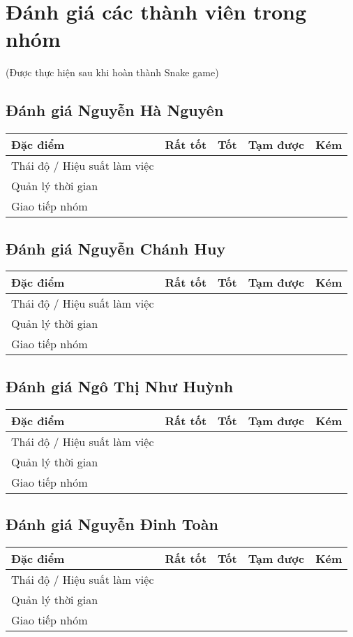 \documentclass[a4paper,12pt]{article}
\begin{document}
\newpage
\section{Đánh giá các thành viên trong nhóm} (Được thực hiện sau khi hoàn thành Snake game)

\subsection{Đánh giá Nguyễn Hà Nguyên}
\begin{tabularx}{\textwidth}{|X|X|X|X|X|}
\hline
\textbf{Đặc điểm} & \textbf{Rất tốt} & \textbf{Tốt} & \textbf{Tạm được} & \textbf{Kém} \\
\hline
Thái độ / Hiệu suất làm việc &  & & & \\
\hline
Quản lý thời gian & &  & & \\
\hline
Giao tiếp nhóm &  & & & \\
\hline
\end{tabularx}

\subsection{Đánh giá Nguyễn Chánh Huy}
\begin{tabularx}{\textwidth}{|X|X|X|X|X|}
\hline
\textbf{Đặc điểm} & \textbf{Rất tốt} & \textbf{Tốt} & \textbf{Tạm được} & \textbf{Kém} \\
\hline
Thái độ / Hiệu suất làm việc & &  & & \\
\hline
Quản lý thời gian &  & & & \\
\hline
Giao tiếp nhóm & &  & & \\
\hline
\end{tabularx}

\subsection{Đánh giá Ngô Thị Như Huỳnh}
\begin{tabularx}{\textwidth}{|X|X|X|X|X|}
\hline
\textbf{Đặc điểm} & \textbf{Rất tốt} & \textbf{Tốt} & \textbf{Tạm được} & \textbf{Kém} \\
\hline
Thái độ / Hiệu suất làm việc &  & & & \\
\hline
Quản lý thời gian & &  & & \\
\hline
Giao tiếp nhóm & &  & & \\
\hline
\end{tabularx}

\subsection{Đánh giá Nguyễn Đinh Toàn}
\begin{tabularx}{\textwidth}{|X|X|X|X|X|}
\hline
\textbf{Đặc điểm} & \textbf{Rất tốt} & \textbf{Tốt} & \textbf{Tạm được} & \textbf{Kém} \\
\hline
Thái độ / Hiệu suất làm việc &  & & & \\
\hline
Quản lý thời gian & &  & & \\
\hline
Giao tiếp nhóm &  & & & \\
\hline
\end{tabularx}
\end{document}
